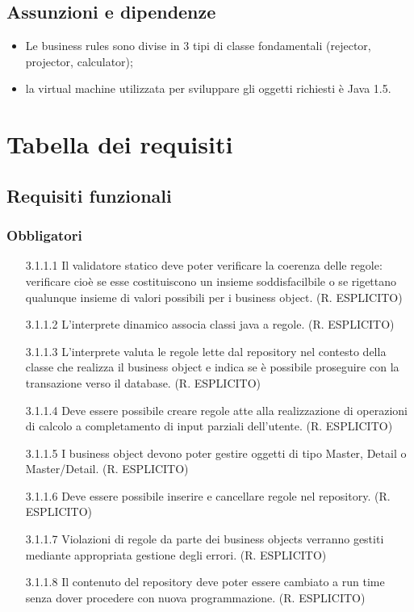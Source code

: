 \documentclass[11pt,titlepage,a4paper]{report}
\begin{document}
\section{Assunzioni e dipendenze}
\begin{itemize}
\item{}Le business rules sono divise in 3 tipi di classe fondamentali (rejector, projector, calculator);
\item{}la virtual machine utilizzata  per sviluppare gli oggetti richiesti \`e Java 1.5.
\end{itemize}
\chapter{Tabella dei requisiti}
\section{Requisiti funzionali}
\subsection{Obbligatori}
\begin{itemize}
\item[3.1.1.1]Il validatore statico deve poter verificare la coerenza delle regole: verificare cio\`e se esse costituiscono un insieme soddisfacilbile o se rigettano qualunque insieme di valori possibili per i business object. (R. ESPLICITO) 
\item[3.1.1.2]L'interprete dinamico associa classi java a regole. (R. ESPLICITO)
\item[3.1.1.3]L'interprete valuta le regole lette dal repository nel contesto della classe che realizza il business object e indica se \`e possibile proseguire con la transazione verso il database. (R. ESPLICITO)
\item[3.1.1.4]Deve essere possibile creare regole atte alla realizzazione di operazioni di calcolo a completamento di input parziali dell'utente. (R. ESPLICITO)
\item[3.1.1.5]I business object devono poter gestire oggetti di tipo Master, Detail o Master/Detail. (R. ESPLICITO)
\item[3.1.1.6]Deve essere possibile inserire e cancellare regole nel repository. (R. ESPLICITO)
\item[3.1.1.7]Violazioni di regole da parte dei business objects verranno gestiti mediante appropriata gestione degli errori. (R. ESPLICITO)
\item[3.1.1.8]Il contenuto del repository deve poter essere cambiato a run time senza dover procedere con nuova programmazione. (R. ESPLICITO)
\end{itemize}
\end{document}
